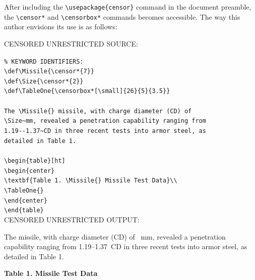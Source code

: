 \documentclass{article}
\begin{document}
After including the \verb|\usepackage{censor}| command in the document
preamble, the \verb|\censor*| and \verb|\censorbox*| commands becomes
accessible.  The way this author envisions its use is as follows:

{\addtolength{\leftskip}{2.3em}
CENSORED UNRESTRICTED SOURCE: \hrulefill

\verb|% KEYWORD IDENTIFIERS:|\\
\verb|\def\Missile{\censor*{7}}|\\
\verb|\def\Size{\censor*{2}}|\\
\verb|\def\TableOne{\censorbox*[\small]{26}{5}{3.5}}|\\
\verb||\\
\verb|The \Missile{} missile, with charge diameter (CD) of|\\
\verb|\Size~mm, revealed a penetration capability ranging from|\\
\verb|1.19--1.37~CD in three recent tests into armor steel, as|\\
\verb|detailed in Table 1.|\\
\verb||\\
\verb|\begin{table}[ht]|\\
\verb|\begin{center}|\\
\verb|\textbf{Table 1. \Missile{} Missile Test Data}\\|\\
\verb|\TableOne{}|\\
\verb|\end{center}|\\
\verb|\end{table}|\\

CENSORED UNRESTRICTED OUTPUT: \hrulefill

\def\Missile{\censor*{7}}
\def\Size{\censor*{2}}
\def\TableOne{\censorbox*[\small]{26}{5}{3.5}}

The {\Missile} missile, with charge diameter (CD) of {\Size}~mm, revealed a
penetration capability ranging from 1.19--1.37~CD in three recent tests
into armor steel, as detailed in Table 1.

\begin{table}[ht]
\begin{center}
\textbf{Table 1. {\Missile} Missile Test Data}\\
{\TableOne}
\end{center}
\end{table}

\hrulefill

}
\end{document}
